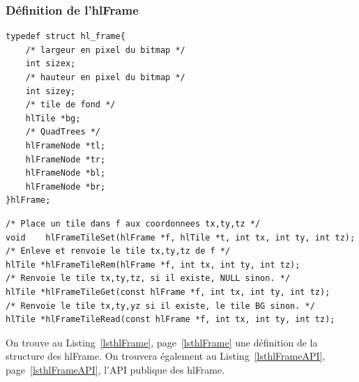 			\subsubsection{Définition de l'hlFrame}
		\begin{lstlisting}[float,caption={Définition des hlFrames },frame=tb,label=lsthlFrame]
typedef struct hl_frame{
	/* largeur en pixel du bitmap */
	int sizex;
	/* hauteur en pixel du bitmap */
	int sizey;
	/* tile de fond */
	hlTile *bg;
	/* QuadTrees */
	hlFrameNode *tl;
	hlFrameNode *tr;
	hlFrameNode *bl;
	hlFrameNode *br;
}hlFrame;
		\end{lstlisting}
		\begin{lstlisting}[float,caption={API Publique des hlFrame},frame=tb,label=lsthlFrameAPI]
/* Place un tile dans f aux coordonnees tx,ty,tz */
void	hlFrameTileSet(hlFrame *f, hlTile *t, int tx, int ty, int tz); 
/* Enleve et renvoie le tile tx,ty,tz de f */
hlTile *hlFrameTileRem(hlFrame *f, int tx, int ty, int tz); 
/* Renvoie le tile tx,ty,tz, si il existe, NULL sinon. */
hlTile *hlFrameTileGet(const hlFrame *f, int tx, int ty, int tz);
/* Renvoie le tile tx,ty,yz si il existe, le tile BG sinon. */
hlTile *hlFrameTileRead(const hlFrame *f, int tx, int ty, int tz);
		\end{lstlisting}
				On trouve au Listing~\ref{lsthlFrame}, page~\ref{lsthlFrame} une définition de la structure des hlFrame.
				On trouvera également au Listing~\ref{lsthlFrameAPI}, page~\ref{lsthlFrameAPI}, 
				l'API publique des hlFrame.


